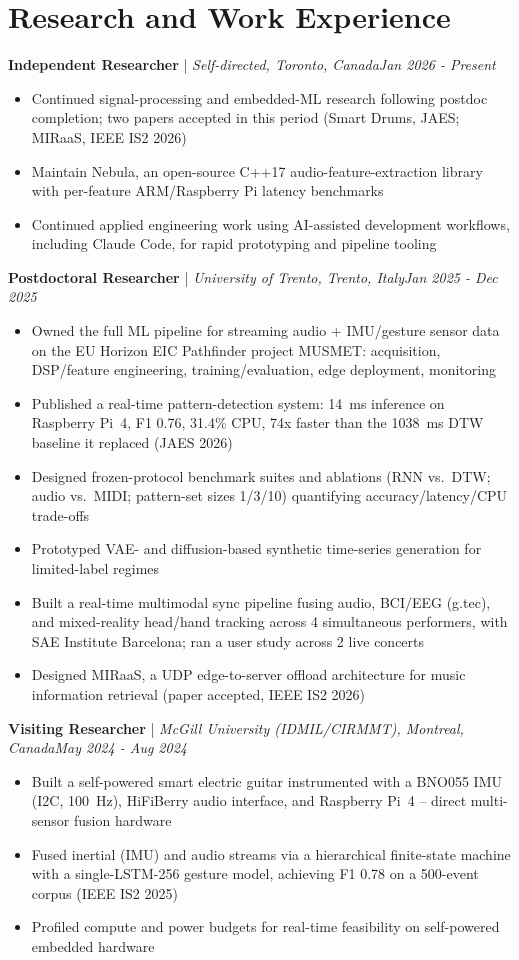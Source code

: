 \documentclass[11pt]{article}
\newenvironment{cvrole}[5]{%
  \par\noindent\textbf{\large #1} | \textit{\small #2, #3}\hfill \textit{\small #4 - #5}\par
  \begin{itemize}[leftmargin=2em, itemsep=-0.3em, topsep=-0.5em]%
}{%
  \end{itemize}\par\noindent\mbox{}\par\vspace{0.1em}%
}
\begin{document}
\section*{Research and Work Experience}

\begin{cvrole}{Independent Researcher}{Self-directed}{Toronto, Canada}{Jan 2026}{Present}
  \item Continued signal-processing and embedded-ML research following postdoc completion; two papers accepted in this period (Smart Drums, JAES; MIRaaS, IEEE IS2 2026)
  \item Maintain Nebula, an open-source C++17 audio-feature-extraction library with per-feature ARM/Raspberry Pi latency benchmarks
  \item Continued applied engineering work using AI-assisted development workflows, including Claude Code, for rapid prototyping and pipeline tooling
\end{cvrole}

\begin{cvrole}{Postdoctoral Researcher}{University of Trento}{Trento, Italy}{Jan 2025}{Dec 2025}
  \item Owned the full ML pipeline for streaming audio + IMU/gesture sensor data on the EU Horizon EIC Pathfinder project MUSMET: acquisition, DSP/feature engineering, training/evaluation, edge deployment, monitoring
  \item Published a real-time pattern-detection system: 14~ms inference on Raspberry Pi~4, F1 0.76, 31.4\% CPU, 74x faster than the 1038~ms DTW baseline it replaced (JAES 2026)
  \item Designed frozen-protocol benchmark suites and ablations (RNN vs.\ DTW; audio vs.\ MIDI; pattern-set sizes 1/3/10) quantifying accuracy/latency/CPU trade-offs
  \item Prototyped VAE- and diffusion-based synthetic time-series generation for limited-label regimes
  \item Built a real-time multimodal sync pipeline fusing audio, BCI/EEG (g.tec), and mixed-reality head/hand tracking across 4 simultaneous performers, with SAE Institute Barcelona; ran a user study across 2 live concerts
  \item Designed MIRaaS, a UDP edge-to-server offload architecture for music information retrieval (paper accepted, IEEE IS2 2026)
\end{cvrole}

\begin{cvrole}{Visiting Researcher}{McGill University (IDMIL/CIRMMT)}{Montreal, Canada}{May 2024}{Aug 2024}
  \item Built a self-powered smart electric guitar instrumented with a BNO055 IMU (I2C, 100~Hz), HiFiBerry audio interface, and Raspberry Pi~4 -- direct multi-sensor fusion hardware
  \item Fused inertial (IMU) and audio streams via a hierarchical finite-state machine with a single-LSTM-256 gesture model, achieving F1 0.78 on a 500-event corpus (IEEE IS2 2025)
  \item Profiled compute and power budgets for real-time feasibility on self-powered embedded hardware
\end{cvrole}
\end{document}
